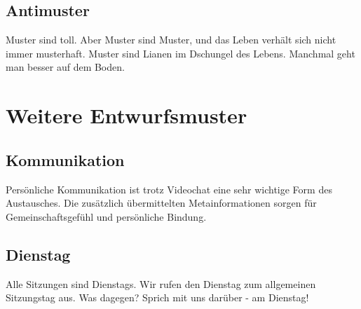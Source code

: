     \subsection{Antimuster}
Muster sind toll.
%
Aber Muster sind Muster, und das Leben verhält sich nicht immer musterhaft.
%
Muster sind Lianen im Dschungel des Lebens. Manchmal geht man besser auf dem Boden.
  \section{Weitere Entwurfsmuster}
     \subsection{Kommunikation}
Persönliche Kommunikation ist trotz Videochat eine sehr wichtige Form des Austausches.
%
Die zusätzlich übermittelten Metainformationen sorgen für Gemeinschaftsgefühl und persönliche Bindung.
     \subsection{Dienstag}
Alle Sitzungen sind Dienstags.
%
Wir rufen den Dienstag zum allgemeinen Sitzungstag aus.
%
Was dagegen? Sprich mit uns darüber - am Dienstag!    